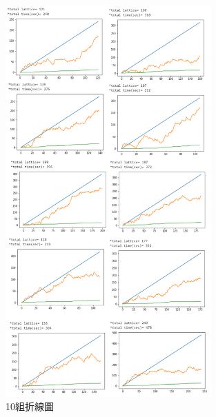 	\begin{figure}[H] 
	\centering 
	\includegraphics[width=0.7\textwidth]{4_6.png} 
	\caption{10組折線圖} 
	\label{Fig.4.6} 
	\end{figure}
